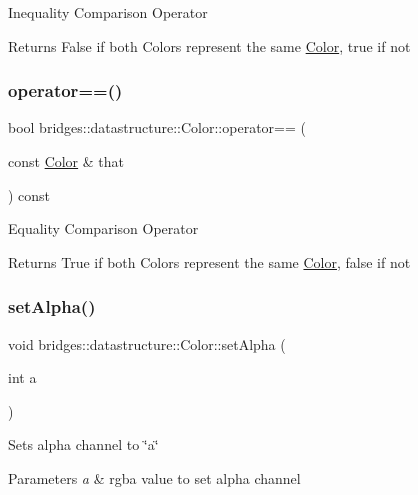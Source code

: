 Inequality Comparison Operator \begin{DoxyReturn}{Returns}
False if both Colors represent the same \hyperlink{classbridges_1_1datastructure_1_1_color}{Color}, true if not 
\end{DoxyReturn}
\mbox{\label{classbridges_1_1datastructure_1_1_color_a43a31ca1f860081116197c9b29e4aa45}} 
\subsubsection{\texorpdfstring{operator==()}{operator==()}}
{\footnotesize\ttfamily bool bridges\+::datastructure\+::\+Color\+::operator== (\begin{DoxyParamCaption}\item[{const \hyperlink{classbridges_1_1datastructure_1_1_color}{Color} \&}]{that }\end{DoxyParamCaption}) const\hspace{0.3cm}{\ttfamily [inline]}}

Equality Comparison Operator \begin{DoxyReturn}{Returns}
True if both Colors represent the same \hyperlink{classbridges_1_1datastructure_1_1_color}{Color}, false if not 
\end{DoxyReturn}
\mbox{\label{classbridges_1_1datastructure_1_1_color_a19ff34702143ec54248438dfad02e4a2}} 
\subsubsection{\texorpdfstring{set\+Alpha()}{setAlpha()}}
{\footnotesize\ttfamily void bridges\+::datastructure\+::\+Color\+::set\+Alpha (\begin{DoxyParamCaption}\item[{int}]{a }\end{DoxyParamCaption})\hspace{0.3cm}{\ttfamily [inline]}}

Sets alpha channel to \char`\"{}a\char`\"{} 
\begin{DoxyParams}{Parameters}
{\em a} & rgba value to set alpha channel \\
\hline
\end{DoxyParams}
\mbox{\label{classbridges_1_1datastructure_1_1_color_a829b0b914125ee30ce3d3e45a52a45c1}} 
